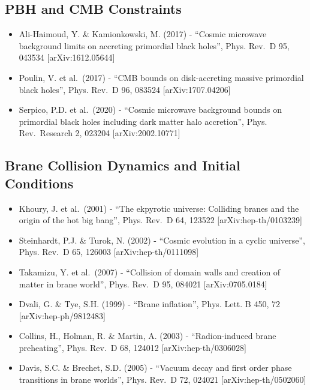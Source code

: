\documentclass[
  11pt,
]{report}
\providecommand{\tightlist}{%
  \setlength{\itemsep}{0pt}\setlength{\parskip}{0pt}}
\begin{document}
\subsection{PBH and CMB Constraints}\label{pbh-and-cmb-constraints}

\begin{itemize}
\tightlist
\item
  Ali-Haimoud, Y. \& Kamionkowski, M. (2017) - ``Cosmic microwave
  background limits on accreting primordial black holes'', Phys. Rev.~D
  95, 043534 {[}arXiv:1612.05644{]}
\item
  Poulin, V. et al.~(2017) - ``CMB bounds on disk-accreting massive
  primordial black holes'', Phys. Rev.~D 96, 083524
  {[}arXiv:1707.04206{]}
\item
  Serpico, P.D. et al.~(2020) - ``Cosmic microwave background bounds on
  primordial black holes including dark matter halo accretion'', Phys.
  Rev.~Research 2, 023204 {[}arXiv:2002.10771{]}
\end{itemize}

\subsection{Brane Collision Dynamics and Initial
Conditions}\label{brane-collision-dynamics-and-initial-conditions}

\begin{itemize}
\tightlist
\item
  Khoury, J. et al.~(2001) - ``The ekpyrotic universe: Colliding branes
  and the origin of the hot big bang'', Phys. Rev.~D 64, 123522
  {[}arXiv:hep-th/0103239{]}
\item
  Steinhardt, P.J. \& Turok, N. (2002) - ``Cosmic evolution in a cyclic
  universe'', Phys. Rev.~D 65, 126003 {[}arXiv:hep-th/0111098{]}
\item
  Takamizu, Y. et al.~(2007) - ``Collision of domain walls and creation
  of matter in brane world'', Phys. Rev.~D 95, 084021
  {[}arXiv:0705.0184{]}
\item
  Dvali, G. \& Tye, S.H. (1999) - ``Brane inflation'', Phys. Lett. B
  450, 72 {[}arXiv:hep-ph/9812483{]}
\item
  Collins, H., Holman, R. \& Martin, A. (2003) - ``Radion-induced brane
  preheating'', Phys. Rev.~D 68, 124012 {[}arXiv:hep-th/0306028{]}
\item
  Davis, S.C. \& Brechet, S.D. (2005) - ``Vacuum decay and first order
  phase transitions in brane worlds'', Phys. Rev.~D 72, 024021
  {[}arXiv:hep-th/0502060{]}
\end{itemize}
\end{document}
